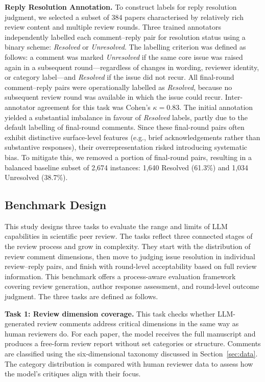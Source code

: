 \documentclass[preprint,10pt,times]{elsarticle}
\begin{document}
\textbf{Reply Resolution Annotation.} To construct labels for reply resolution judgment, we selected a subset of 384 papers characterised by relatively rich review content and multiple review rounds. Three trained annotators independently labelled each comment--reply pair for resolution status using a binary scheme: \textit{Resolved} or \textit{Unresolved}. The labelling criterion was defined as follows: a comment was marked \textit{Unresolved} if the same core issue was raised again in a subsequent round---regardless of changes in wording, reviewer identity, or category label---and \textit{Resolved} if the issue did not recur. All final-round comment--reply pairs were operationally labelled as \textit{Resolved}, because no subsequent review round was available in which the issue could recur. Inter-annotator agreement for this task was Cohen's $\kappa = 0.83$. The initial annotation yielded a substantial imbalance in favour of \textit{Resolved} labels, partly due to the default labelling of final-round comments. Since these final-round pairs often exhibit distinctive surface-level features (e.g., brief acknowledgements rather than substantive responses), their overrepresentation risked introducing systematic bias. To mitigate this, we removed a portion of final-round pairs, resulting in a balanced baseline subset of 2,674 instances: 1,640 Resolved (61.3\%) and 1,034 Unresolved (38.7\%).

\subsection{Benchmark Design}
\label{sec:benchmark}

This study designs three tasks to evaluate the range and limits of LLM capabilities in scientific peer review. The tasks reflect three connected stages of the review process and grow in complexity. They start with the distribution of review comment dimensions, then move to judging issue resolution in individual review--reply pairs, and finish with round-level acceptability based on full review information. This benchmark offers a process-aware evaluation framework covering review generation, author response assessment, and round-level outcome judgment. The three tasks are defined as follows.

\textbf{Task 1: Review dimension coverage.} This task checks whether LLM-generated review comments address critical dimensions in the same way as human reviewers do. For each paper, the model receives the full manuscript and produces a free-form review report without set categories or structure. Comments are classified using the six-dimensional taxonomy discussed in Section~\ref{sec:data}. The category distribution is compared with human reviewer data to assess how the model's critiques align with their focus.
\end{document}
